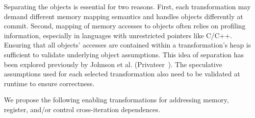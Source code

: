Separating the objects is essential
for two reasons. First, each transformation may demand different
memory mapping semantics and handles objects differently at commit.
Second, mapping of memory accesses to
objects often relies on profiling information, especially in languages with
unrestricted pointers like C/C++. Ensuring that all objects' accesses
are contained within a transformation's heap is sufficient to
validate underlying object assumptions. This idea of separation has
been explored previously by Johnson et al. (Privateer~\cite{johnson:12:pldi}).
The speculative assumptions used for each selected transformation also need
to be validated at runtime to ensure correctness.
%

%



We propose the following enabling transformations for addressing memory,
register, and/or control cross-iteration dependences.

